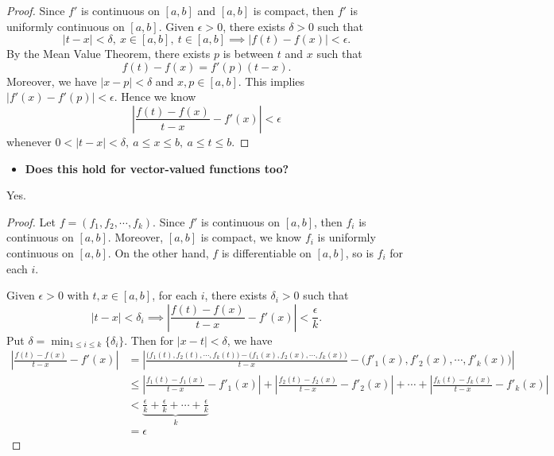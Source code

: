 \begin{Exercise}
	\begin{proof}
		Since $f'$ is continuous on $[a,b]$ and $[a,b]$ is compact, then $f'$ is uniformly continuous on $[a,b]$.
		Given $\epsilon>0$, there exists $\delta > 0$ such that
		$$
		|t-x|<\delta,\ x\in[a,b],\ t\in[a,b] \implies |f(t)-f(x)|<\epsilon.
		$$
		By the Mean Value Theorem, there exists $p$ is between $t$ and $x$ such that
		$$
		f(t)-f(x) = f'(p) (t-x).
		$$
		Moreover, we have $|x-p|<\delta$ and $x,p\in [a,b]$.
		This implies $|f'(x) - f'(p)|<\epsilon$.
		Hence we know
		$$
		\left| \frac{f(t)-f(x)}{t-x}-f'(x) \right| < \epsilon
		$$
		whenever $0<|t-x|<\delta,\ a\leq x \leq b,\ a\leq t\leq b$. 
	\end{proof}
	
	\begin{itemize}
		\item \textbf{Does this hold for vector-valued functions too?}
	\end{itemize}
	\begin{answer}
		Yes.
	\end{answer}
	\begin{proof}
		Let $f = (f_1, f_2, \cdots, f_k)$.
		Since $f'$ is continuous on $[a,b]$, then $f_i$ is continuous on $[a,b]$.
		Moreover, $[a,b]$ is compact, we know $f_i$ is uniformly continuous on $[a,b]$.
		On the other hand, $f$ is differentiable on $[a,b]$, so is $f_i$ for each $i$.
		
		Given $\epsilon>0$ with $t,x\in [a,b]$, for each $i$, there exists $\delta_i >0$ such that
		$$
		|t-x|<\delta_i \implies \left| \frac{f(t)-f(x)}{t-x}-f'(x) \right| < \frac{\epsilon}{k}. 
		$$
		Put $\delta = \min_{1\leq i \leq k}\{\delta_i\}$. Then for $|x-t|<\delta$, we have
		\begin{align*}
		\left| \frac{f(t)-f(x)}{t-x}-f'(x) \right| 
		&= \left| \frac{\big( f_1(t), f_2(t),\cdots, f_k(t)\big) - \big( f_1(x), f_2(x),\cdots, f_k(x)\big)}{t-x} - \big( f'_1(x), f'_2(x), \cdots, f'_k(x) \big)\right| \\
		&\leq \left| \frac{f_1(t)-f_1(x)}{t-x}-f'_1(x) \right| + \left| \frac{f_2(t)-f_2(x)}{t-x}-f'_2(x) \right| + \cdots + \left| \frac{f_k(t)-f_k(x)}{t-x}-f'_k(x) \right| \\
		&< \underbrace{ \frac{\epsilon}{k} + \frac{\epsilon}{k} + \cdots +  \frac{\epsilon}{k}  }_k \\
		&= \epsilon
		\end{align*}
	\end{proof}
\end{Exercise}